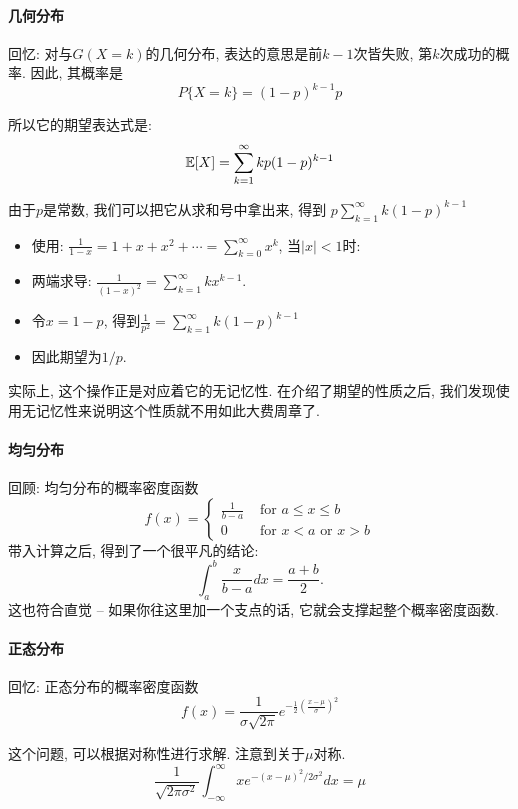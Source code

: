 \paragraph{几何分布}
回忆: 对与$G(X=k)$的几何分布, 表达的意思是前$k-1$次皆失败, 第$k$次成功的概率. 因此, 其概率是
    $$
    P\{X=k\}=(1-p)^{k-1} p
    $$

    所以它的期望表达式是: 
    $$
    \mathbb E[X]=\sum_{k=1}^{\infty} k p(1-p)^{k-1}
    $$

    由于$p$是常数, 我们可以把它从求和号中拿出来, 得到
    $p \sum_{k=1}^{\infty} k(1-p)^{k-1}$


\begin{itemize}
    \item 使用: $\frac{1}{1-x}  =1+x+x^2+\cdots =\sum_{k=0}^{\infty} x^k$, 当$|x|<1$时: 
    \item 两端求导: $\frac{1}{(1-x)^2}=\sum_{k=1}^{\infty} k x^{k-1}$.
    \item 令$x=1-p$, 得到$\frac{1}{p^2}=\sum_{k=1}^{\infty} k(1-p)^{k-1}$
    \item 因此期望为$1/p$.
\end{itemize}

实际上, 这个操作正是对应着它的无记忆性. 在介绍了期望的性质之后, 我们发现使用无记忆性来说明这个性质就不用如此大费周章了. 

\paragraph{均匀分布} 回顾: 均匀分布的概率密度函数$$
f(x)= \begin{cases}\frac{1}{b-a} & \text { for } a \leq x \leq b \\ 0 & \text { for } x<a \text { or } x>b\end{cases}
$$
带入计算之后, 得到了一个很平凡的结论: $$\int_a^b \frac{x}{b-a} d x=\frac{a+b}{2}.$$
这也符合直觉 -- 如果你往这里加一个支点的话, 它就会支撑起整个概率密度函数. 

\paragraph{正态分布}
回忆: 正态分布的概率密度函数$$
    f(x)=\frac{1}{\sigma \sqrt{2 \pi}} e^{-\frac{1}{2}\left(\frac{x-\mu}{\sigma}\right)^2}
    $$

    这个问题, 可以根据对称性进行求解. 注意到关于$\mu$对称.  
    $$
\frac{1}{\sqrt{2 \pi \sigma^2}} \int_{-\infty}^{\infty} x e^{-(x-\mu)^2 / 2 \sigma^2} d x=\mu
$$


